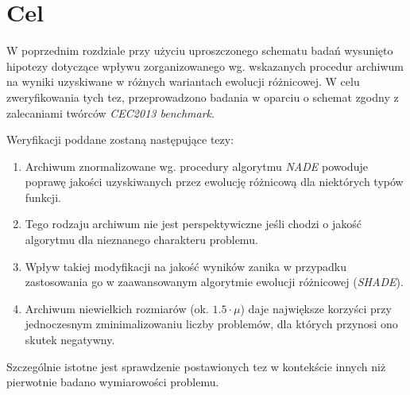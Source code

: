 \documentclass[12pt,a4paper]{report}
\begin{document}
{{{{{{{\section{Cel}
\par{
W poprzednim rozdziale przy użyciu uproszczonego schematu badań wysunięto hipotezy dotyczące wpływu zorganizowanego wg. wskazanych procedur archiwum na wyniki uzyskiwane w różnych wariantach ewolucji różnicowej. W celu zweryfikowania tych tez, przeprowadzono badania w oparciu o schemat zgodny z zalecaniami twórców \emph{CEC2013 benchmark}.
}
\par{
Weryfikacji poddane zostaną następujące tezy:
\begin{enumerate}
\item Archiwum znormalizowane wg. procedury algorytmu \emph{NADE} powoduje poprawę jakości uzyskiwanych przez ewolucję różnicową dla niektórych typów funkcji.
\item Tego rodzaju archiwum nie jest perspektywiczne jeśli chodzi o jakość algorytmu dla nieznanego charakteru problemu.
\item Wpływ takiej modyfikacji na jakość wyników zanika w przypadku zastosowania go w zaawansowanym algorytmie ewolucji różnicowej (\emph{SHADE}).
\item Archiwum niewielkich rozmiarów (ok. $1.5 \cdot \mu$) daje największe korzyści przy jednoczesnym zminimalizowaniu liczby problemów, dla których przynosi ono skutek negatywny.
\end{enumerate}
}
\par{
Szczególnie istotne jest sprawdzenie postawionych tez w kontekście innych niż pierwotnie badano wymiarowości problemu.
}

}}}}}}}
\end{document}
